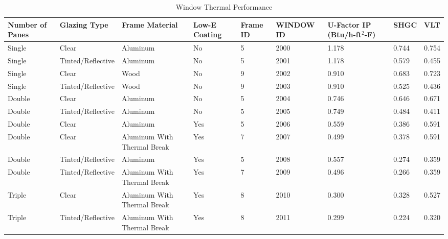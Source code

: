 \begin{table}
\scriptsize
\centering
\caption[Window Thermal Performance]{Window Thermal Performance}
\label{tab:window_thermal_performance}
\begin{tabular}{|p{0.4in}|p{0.67in}|p{1.3in}|p{0.3in}|p{0.3in}|p{0.4in}|p{0.3in}|p{0.3in}|p{0.3in}|}
\hline
\textbf{Number of Panes} & \textbf{Glazing Type} & \textbf{Frame Material} & \textbf{Low-E Coating} & \textbf{Frame ID} & \textbf{WINDOW ID} & \textbf{U-Factor IP (Btu/h-ft$^2$-F)} & \textbf{SHGC}  & \textbf{VLT} \\ \hline
Single          & Clear             & Aluminum                    & No            & 5        & 2000      & 1.178                     & 0.744 & 0.754 \\ \hline
Single          & Tinted/Reflective & Aluminum                    & No            & 5        & 2001      & 1.178                     & 0.579 & 0.455 \\ \hline
Single          & Clear             & Wood                        & No            & 9        & 2002      & 0.910                     & 0.683 & 0.723 \\ \hline
Single          & Tinted/Reflective & Wood                        & No            & 9        & 2003      & 0.910                     & 0.525 & 0.436 \\ \hline
Double          & Clear             & Aluminum                    & No            & 5        & 2004      & 0.746                     & 0.646 & 0.671 \\ \hline
Double          & Tinted/Reflective & Aluminum                    & No            & 5        & 2005      & 0.749                     & 0.484 & 0.411 \\ \hline
Double          & Clear             & Aluminum                    & Yes           & 5        & 2006      & 0.559                     & 0.386 & 0.591 \\ \hline
Double          & Clear             & Aluminum With Thermal Break & Yes           & 7        & 2007      & 0.499                     & 0.378 & 0.591 \\ \hline
Double          & Tinted/Reflective & Aluminum                    & Yes           & 5        & 2008      & 0.557                     & 0.274 & 0.359 \\ \hline
Double          & Tinted/Reflective & Aluminum With Thermal Break & Yes           & 7        & 2009      & 0.496                     & 0.266 & 0.359 \\ \hline
Triple          & Clear             & Aluminum With Thermal Break & Yes           & 8        & 2010      & 0.300                     & 0.328 & 0.527 \\ \hline
Triple          & Tinted/Reflective & Aluminum With Thermal Break & Yes           & 8        & 2011      & 0.299                     & 0.224 & 0.320 \\ \hline
\end{tabular}
\end{table}